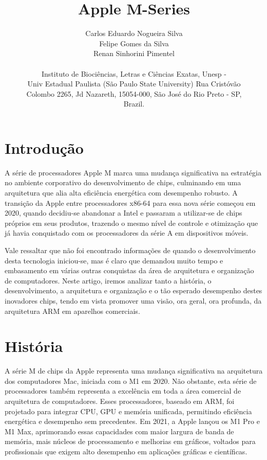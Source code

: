 \documentclass[a4paper,times,12pt]{article}
\begin{document}
\title{Apple M-Series}
\author{Carlos Eduardo Nogueira Silva\\Felipe Gomes da Silva \\Renan Sinhorini Pimentel\\ \\Instituto de Bioci\^{e}ncias, Letras e Ci\^{e}ncias Exatas, Unesp - \\ Univ Estadual Paulista (S\~{a}o Paulo State University) Rua Crist\'{o}v\~{a}o \\ Colombo 2265, Jd Nazareth, 15054-000, S\~{a}o Jos\'{e} do Rio Preto - SP, \\ Brazil.}
\maketitle

\section{Introdução}
\hspace*{+15pt} 
A série de processadores Apple M marca uma mudança significativa na estratégia no ambiente corporativo do desenvolvimento de chips, culminando em uma arquitetura que alia alta eficiência energética com desempenho robusto. A transição da Apple entre processadores x86-64 para essa nova série começou em 2020, quando decidiu-se abandonar a Intel e passaram a utilizar-se de chips próprios em seus produtos, trazendo o mesmo nível de controle e otimização que já havia conquistado com os processadores da série A em dispositivos móveis.

Vale ressaltar que não foi encontrado informações de quando o desenvolvimento desta tecnologia iniciou-se, mas é claro que demandou muito tempo e embasamento em várias outras conquistas da área de arquitetura e organização de computadores. Neste artigo, iremos analizar tanto a história, o desenvolvimento, a arquitetura e organização e o tão esperado desempenho destes inovadores chips, tendo em vista promover uma visão, ora geral, ora profunda, da arquitetura ARM em aparelhos comerciais.

\section{História}
\hspace{+15pt} 
A série M de chips da Apple representa uma mudança significativa na arquitetura dos computadores Mac, iniciada com o M1 em 2020. Não obstante, esta série de processadores também representa a excelência em toda a área comercial de arquitetura de computadores. Esses processadores, baseado em ARM, foi projetado para integrar CPU, GPU e memória unificada, permitindo eficiência energética e desempenho sem precedentes. Em 2021, a Apple lançou os M1 Pro e M1 Max, aprimorando essas capacidades com maior largura de banda de memória, mais núcleos de processamento e melhorias em gráficos, voltados para profissionais que exigem alto desempenho em aplicações gráficas e científicas.
\end{document}
